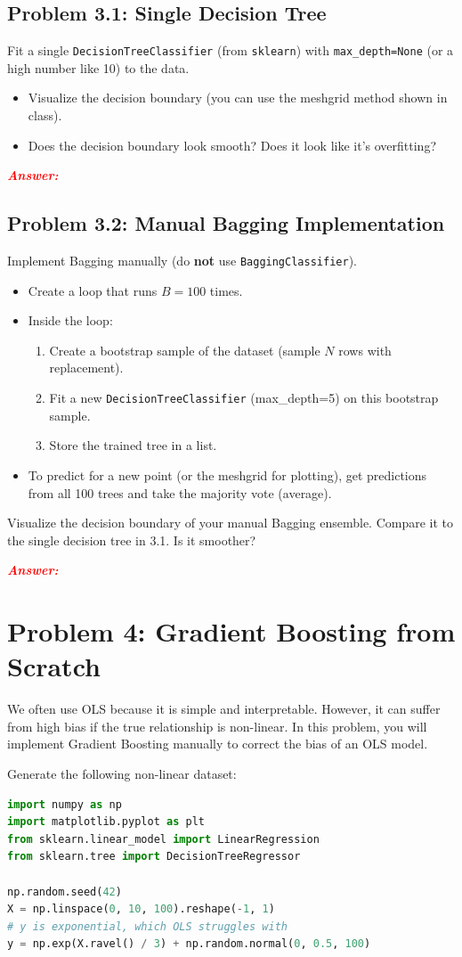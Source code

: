 \documentclass[11pt, letterpaper]{article}
\newcommand{\problem}[1]{\section*{Problem #1}}
\newcommand{\subproblem}[1]{\subsection*{Problem #1}}
\newcommand{\answer}{\textbf{\textit{\textcolor{red}{Answer:}}}}
\begin{document}
\subproblem{3.1: Single Decision Tree}
Fit a single \texttt{DecisionTreeClassifier} (from \texttt{sklearn}) with \texttt{max\_depth=None} (or a high number like 10) to the data.
\begin{itemize}
    \item Visualize the decision boundary (you can use the meshgrid method shown in class).
    \item Does the decision boundary look smooth? Does it look like it's overfitting?
\end{itemize}

\answer

\subproblem{3.2: Manual Bagging Implementation}
Implement Bagging manually (do \textbf{not} use \texttt{BaggingClassifier}).
\begin{itemize}
    \item Create a loop that runs $B=100$ times.
    \item Inside the loop:
    \begin{enumerate}
        \item Create a bootstrap sample of the dataset (sample $N$ rows with replacement).
        \item Fit a new \texttt{DecisionTreeClassifier} (max\_depth=5) on this bootstrap sample.
        \item Store the trained tree in a list.
    \end{enumerate}
    \item To predict for a new point (or the meshgrid for plotting), get predictions from all 100 trees and take the majority vote (average).
\end{itemize}

Visualize the decision boundary of your manual Bagging ensemble. Compare it to the single decision tree in 3.1. Is it smoother?

\answer

\problem{4: Gradient Boosting from Scratch}

We often use OLS because it is simple and interpretable. However, it can suffer from high bias if the true relationship is non-linear. In this problem, you will implement Gradient Boosting manually to correct the bias of an OLS model.

Generate the following non-linear dataset:
    \begin{lstlisting}[language=Python]
import numpy as np
import matplotlib.pyplot as plt
from sklearn.linear_model import LinearRegression
from sklearn.tree import DecisionTreeRegressor

np.random.seed(42)
X = np.linspace(0, 10, 100).reshape(-1, 1)
# y is exponential, which OLS struggles with
y = np.exp(X.ravel() / 3) + np.random.normal(0, 0.5, 100)\end{lstlisting}
\end{document}
